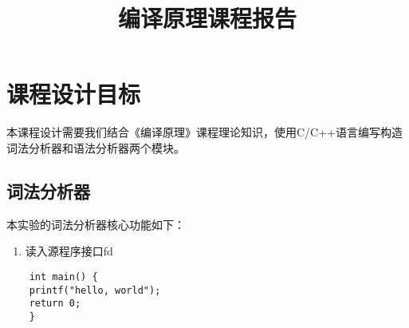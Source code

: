 \documentclass{xcumcmart}
\title{编译原理课程报告}
\begin{document}
\renewcommand\arraystretch{2}
\maketitle

\section{课程设计目标}
\par 本课程设计需要我们结合《编译原理》课程理论知识，使用C/C++语言编写构造词法分析器和语法分析器两个模块。
\subsection{词法分析器}
\par 本实验的词法分析器核心功能如下：
\begin{enumerate}[1]
    \item 读入源程序接口fd
\end{enumerate}


\begin{verbatim}
    int main() {
    printf("hello, world");
    return 0;
    }
\end{verbatim}
\end{document}

